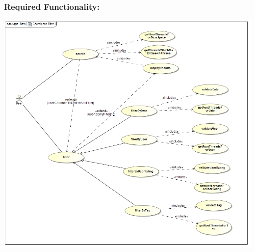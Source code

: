 \documentclass[a4paper,11pt]{article}
\begin{document}
\subsubsection{Required Functionality:} 
\includegraphics[width=1\linewidth]{Images/SearchAndFilter/SearchAndFilter_usecase}\\
\end{document}
